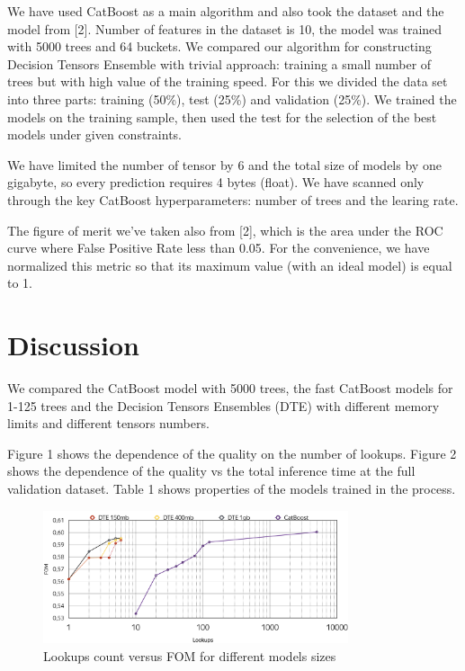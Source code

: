 \documentclass[a4paper]{jpconf}
\begin{document}
We have used CatBoost as a main algorithm and also took the dataset and the model from [2]. Number of features in the dataset is 10, the model was trained with 5000 trees and 64 buckets. We compared our algorithm for constructing Decision Tensors Ensemble with trivial approach: training a small number of trees but with high value of the training speed.
For this we divided the data set into three parts: training (50\%), test (25\%) and validation (25\%). We trained the models on the training sample, then used the test for the selection of the best models under given constraints.

We have limited the number of tensor by 6 and the total size of models by one gigabyte, so every prediction requires 4 bytes (float). We have scanned only through the key CatBoost hyperparameters: number of trees and the learing rate.

The figure of merit we've taken also from [2], which is the area under the ROC curve where False Positive Rate less than 0.05. For the convenience, we have normalized this metric so that its maximum value (with an ideal model) is equal to 1.

\section{Discussion}

We compared the CatBoost model with 5000 trees, the fast CatBoost models for 1-125 trees and the Decision Tensors Ensembles (DTE) with different memory limits and different tensors numbers.

Figure 1 shows the dependence of the quality on the number of lookups. Figure 2 shows the dependence of the quality vs the total inference time at the full validation dataset. Table 1 shows properties of the models trained in the process.

\begin{figure}[h]
\begin{center}
\includegraphics[width=0.8\textwidth]{"lookups.png"}
\caption{Lookups count versus FOM for different models sizes}
\end{center}
\end{figure}
\end{document}
